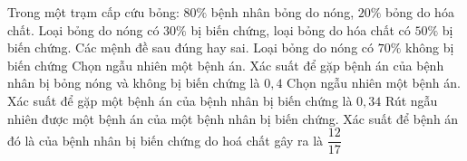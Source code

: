 \begin{ex}%
    Trong một trạm cấp cứu bỏng: $80\%$ bệnh nhân bỏng do nóng, $20\%$ bỏng do hóa chất. Loại bỏng do nóng có $30\%$ bị biến chứng, loại bỏng do hóa chất có $50\%$ bị biến chứng. Các mệnh đề sau đúng hay sai.
    \choiceTF
    {\True Loại bỏng do nóng có $70\%$ không bị biến chứng}
    { Chọn ngẫu nhiên một bệnh án. Xác suất để gặp bệnh án của bệnh nhân bị bỏng nóng và không bị biến chứng là $0,4$}
    {\True Chọn ngẫu nhiên một bệnh án. Xác suất để gặp một bệnh án của bệnh nhân bị biến chứng là $0,34$}
    { Rút ngẫu nhiên được một bệnh án của một bệnh nhân bị biến chứng. Xác suất để bệnh án đó là của bệnh nhân bị biến chứng do hoá chất gây ra là $\dfrac{12}{17}$}
\end{ex}
